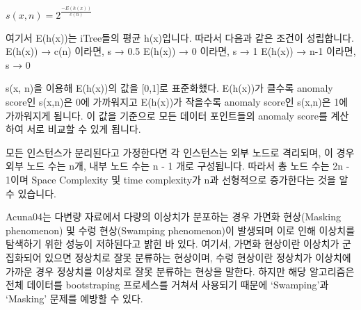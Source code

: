                         $s(x,n) = 2^\frac{-E(h(x))}{c(n)}$

                    여기서 E(h(x))는 iTree들의 평균 h(x)입니다. 따라서 다음과 같은 조건이 성립합니다.
                        E(h(x)) → c(n) 이라면, s → 0.5
                        E(h(x)) → 0 이라면, s → 1
                        E(h(x)) → n-1 이라면, s → 0

                    s(x, n)을 이용해 E(h(x))의 값을 [0,1]로 표준화했다. E(h(x))가 클수록 anomaly score인 s(x,n)은 0에 가까워지고 E(h(x))가 작을수록 anomaly score인 s(x,n)은 1에 가까워지게 됩니다. 이 값을 기준으로 모든 데이터 포인트들의 anomaly score를 계산하여 서로 비교할 수 있게 됩니다.

                모든 인스턴스가 분리된다고 가정한다면 각 인스턴스는 외부 노드로 격리되며, 이 경우 외부 노드 수는 n개, 내부 노드 수는 n - 1 개로 구성됩니다. 따라서 총 노드 수는 2n - 1이며 Space Complexity 및 time complexity가 n과 선형적으로 증가한다는 것을 알 수 있습니다.

                Acuna04는 다변량 자료에서 다량의 이상치가 분포하는 경우 가면화 현상(Masking phenomenon) 및 수렁 현상(Swamping phenomenon)이 발생되며 이로 인해 이상치를 탐색하기 위한 성능이 저하된다고 밝힌 바 있다. 여기서, 가면화 현상이란 이상치가 군집화되어 있으면 정상치로 잘못 분류하는 현상이며, 수렁 현상이란 정상치가 이상치에 가까운 경우 정상치를 이상치로 잘못 분류하는 현상을 말한다. 하지만 해당 알고리즘은 전체 데이터를 bootstraping 프로세스를 거쳐서 사용되기 때문에 ‘Swamping’과 ‘Masking’ 문제를 예방할 수 있다.